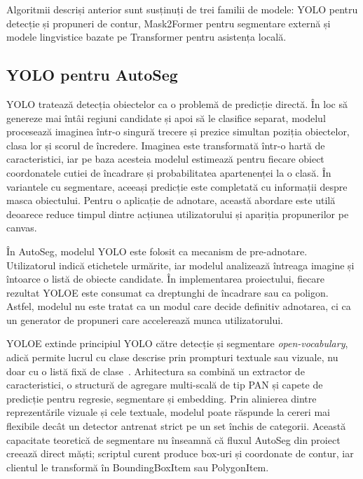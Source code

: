 Algoritmii descriși anterior sunt susținuți de trei familii de modele: YOLO pentru detecție și propuneri de contur, Mask2Former pentru segmentare externă și modele lingvistice bazate pe Transformer pentru asistența locală.

\subsection{YOLO pentru AutoSeg}
\label{subsec:model-yolo-autoseg}

YOLO tratează detecția obiectelor ca o problemă de predicție directă.
În loc să genereze mai întâi regiuni candidate și apoi să le clasifice separat, modelul procesează imaginea într-o singură trecere și prezice simultan poziția obiectelor, clasa lor și scorul de încredere.
Imaginea este transformată într-o hartă de caracteristici, iar pe baza acesteia modelul estimează pentru fiecare obiect coordonatele cutiei de încadrare și probabilitatea apartenenței la o clasă.
În variantele cu segmentare, aceeași predicție este completată cu informații despre masca obiectului.
Pentru o aplicație de adnotare, această abordare este utilă deoarece reduce timpul dintre acțiunea utilizatorului și apariția propunerilor pe canvas.

În AutoSeg, modelul YOLO este folosit ca mecanism de pre-adnotare.
Utilizatorul indică etichetele urmărite, iar modelul analizează întreaga imagine și întoarce o listă de obiecte candidate.
În implementarea proiectului, fiecare rezultat YOLOE este consumat ca dreptunghi de încadrare sau ca poligon.
Astfel, modelul nu este tratat ca un modul care decide definitiv adnotarea, ci ca un generator de propuneri care accelerează munca utilizatorului.

YOLOE extinde principiul YOLO către detecție și segmentare \textit{open-vocabulary}, adică permite lucrul cu clase descrise prin prompturi textuale sau vizuale, nu doar cu o listă fixă de clase~\cite{wang2025yoloerealtimeseeing}.
Arhitectura sa combină un extractor de caracteristici, o structură de agregare multi-scală de tip PAN și capete de predicție pentru regresie, segmentare și embedding.
Prin alinierea dintre reprezentările vizuale și cele textuale, modelul poate răspunde la cereri mai flexibile decât un detector antrenat strict pe un set închis de categorii.
Această capacitate teoretică de segmentare nu înseamnă că fluxul AutoSeg din proiect creează direct măști; scriptul curent produce box-uri și coordonate de contur, iar clientul le transformă în BoundingBoxItem sau PolygonItem.

